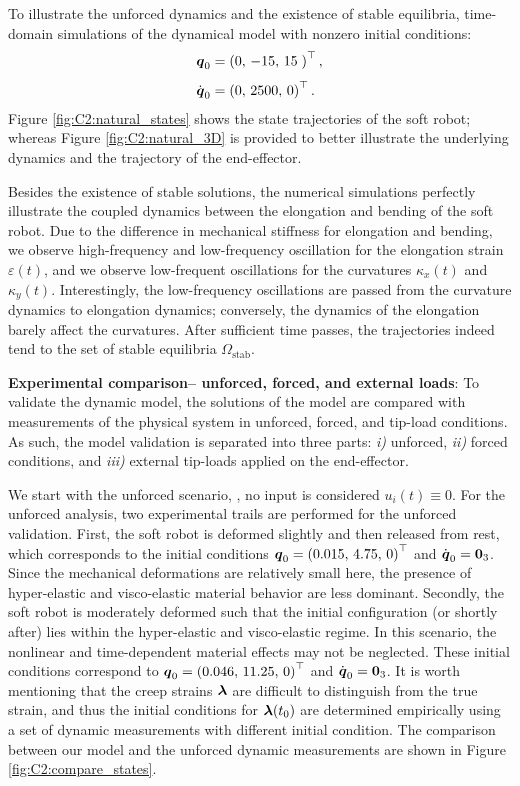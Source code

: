 To illustrate the unforced dynamics and the existence of stable equilibria, time-domain simulations of the dynamical model with nonzero initial conditions:
%
\begin{align*}
{\boldsymbol{q}}_0 & = \left(0,\,-15,\,15\; \right)^\top, \\[0.35em] {\dot{\boldsymbol{q}}}_0 & = \left(0,\,2500,\,0 \right)^\top.
\end{align*}
%
Figure \ref{fig:C2:natural_states} shows the state trajectories of the soft robot; whereas Figure \ref{fig:C2:natural_3D} is provided to better illustrate the underlying dynamics and the trajectory of the end-effector.
%

Besides the existence of stable solutions, the numerical simulations perfectly illustrate the coupled dynamics between the elongation and bending of the soft robot. Due to the difference in mechanical stiffness for elongation and bending, we observe high-frequency and low-frequency oscillation for the elongation strain $\varepsilon(t)$, and we observe low-frequent oscillations for the curvatures $\kappa_x(t)$ and $\kappa_y(t)$. Interestingly, the low-frequency oscillations are passed from the curvature dynamics to elongation dynamics; conversely, the dynamics of the elongation barely affect the curvatures. After sufficient time passes, the trajectories indeed tend to the set of stable equilibria $\Omega_{\textrm{stab}}$.

\textbf{ Experimental comparison-- unforced, forced, and external loads}:
\noindent To validate the dynamic model, the solutions of the model are compared with measurements of the physical system in unforced,  forced, and tip-load conditions. As such, the model validation is separated into three parts: \textit{i)} unforced, \textit{ii)} forced conditions, and \textit{iii)} external tip-loads applied on the end-effector.

We start with the unforced scenario, \ie, no input is considered $u_i(t) \equiv 0$. For the unforced analysis, two experimental trails are performed for the unforced validation. First, the soft robot is deformed slightly and then released from rest, which corresponds to the initial conditions ${\boldsymbol{q}}_0 = \left(0.015,\,4.75,\,0 \right)^\top$ and ${\dot{\boldsymbol{q}}}_0 = \boldsymbol{0}_3$. Since the mechanical deformations are relatively small here, the presence of hyper-elastic and visco-elastic material behavior are less dominant. Secondly, the soft robot is moderately deformed such that the initial configuration (or shortly after) lies within the hyper-elastic and visco-elastic regime. In this scenario, the nonlinear and time-dependent material effects may not be neglected. These initial conditions correspond to ${\boldsymbol{q}}_0 = \left(0.046,\,11.25,\,0 \right)^\top$ and ${\dot{\boldsymbol{q}}}_0 = \boldsymbol{0}_3$. It is worth mentioning that the creep strains $\boldsymbol{\lambda}$ are difficult to distinguish from the true strain, and thus the initial conditions for $\boldsymbol{\lambda}(t_0)$ are determined empirically  using a set of dynamic measurements with different initial condition. The comparison between our model and the unforced dynamic measurements are shown in Figure \ref{fig:C2:compare_states}. 



